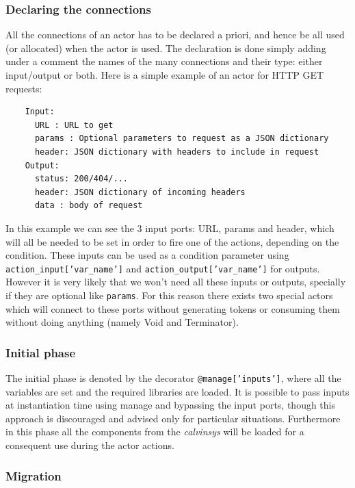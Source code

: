\subsubsection{Declaring the connections}

All the connections of an actor has to be declared a priori, and hence be all used (or allocated)
when the actor is used. The declaration is done simply adding under a comment the names of the many connections
and their type: either input/output or both. Here is a simple example of an actor for HTTP GET requests:

\begin{verbatim}
    Input:
      URL : URL to get
      params : Optional parameters to request as a JSON dictionary
      header: JSON dictionary with headers to include in request
    Output:
      status: 200/404/...
      header: JSON dictionary of incoming headers
      data : body of request
\end{verbatim}

In this example we can see the 3 input ports: URL, params and header, which will all be needed to be set
in order to fire one of the actions, depending on the condition. These inputs can be used
as a condition parameter using \texttt{action\_input['var\_name']} and \texttt{action\_output['var\_name']}
for outputs.\\
However it is very likely that we won't need all these inputs or outputs, specially if they are optional
like \texttt{params}. For this reason there exists two special actors which will connect to these
ports without generating tokens or consuming them without doing anything (namely Void and Terminator).

\subsubsection{Initial phase}

The initial phase is denoted by the decorator \texttt{@manage['inputs']}, where all the variables
are set and the required libraries are loaded. It is possible to pass inputs at instantiation
time using manage and bypassing the input ports, though this approach is discouraged and
advised only for particular situations. Furthermore in this phase all the components
from the \textit{calvinsys} will be loaded for a consequent use during the actor actions.

\subsubsection{Migration}

